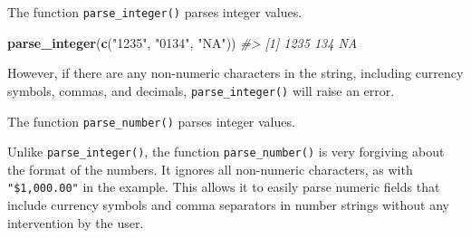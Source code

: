 \documentclass[]{book}
\newenvironment{Shaded}{\begin{snugshade}}{\end{snugshade}}
\newcommand{\CommentTok}[1]{\textcolor[rgb]{0.56,0.35,0.01}{\textit{#1}}}
\newcommand{\KeywordTok}[1]{\textcolor[rgb]{0.13,0.29,0.53}{\textbf{#1}}}
\newcommand{\NormalTok}[1]{#1}
\newcommand{\StringTok}[1]{\textcolor[rgb]{0.31,0.60,0.02}{#1}}
\theoremstyle{plain}
\theoremstyle{remark}
\begin{document}
The function \texttt{parse\_integer()} parses integer values.

\begin{Shaded}
\begin{Highlighting}[]
\KeywordTok{parse_integer}\NormalTok{(}\KeywordTok{c}\NormalTok{(}\StringTok{"1235"}\NormalTok{, }\StringTok{"0134"}\NormalTok{, }\StringTok{"NA"}\NormalTok{))}
\CommentTok{#> [1] 1235  134   NA}
\end{Highlighting}
\end{Shaded}

However, if there are any non-numeric characters in the string, including
currency symbols, commas, and decimals, \texttt{parse\_integer()} will raise an error.

\begin{Shaded}
\end{Shaded}

The function \texttt{parse\_number()} parses integer values.

\begin{Shaded}
\end{Shaded}

Unlike \texttt{parse\_integer()}, the function \texttt{parse\_number()} is very forgiving about the format of the numbers.
It ignores all non-numeric characters, as with \texttt{"\$1,000.00"} in the example.
This allows it to easily parse numeric fields that include currency symbols and comma separators in number strings without any intervention by the user.
\end{document}
